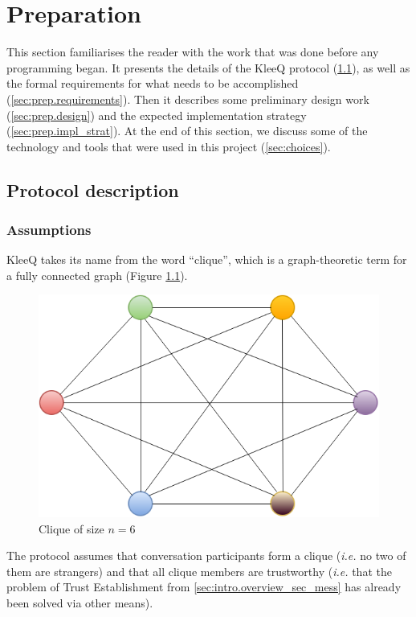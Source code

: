 \documentclass[a4paper, twoside, 12pt]{report}
\newcommand{\skippage}{\newpage\null\newpage}
\begin{document}
\skippage

\chapter{Preparation}
\label{ch:prep}
This section familiarises the reader with the work that was done before any programming began. It presents the details of the KleeQ protocol (\cref{sec:prep.proto}), as well as the formal requirements for what needs to be accomplished (\cref{sec:prep.requirements}). Then it describes some preliminary design work (\cref{sec:prep.design}) and the expected implementation strategy (\cref{sec:prep.impl_strat}). At the end of this section, we discuss some of the technology and tools that were used in this project (\cref{sec:choices}).

\section{Protocol description}
\label{sec:prep.proto}

\subsection{Assumptions}
KleeQ takes its name from the word ``clique'', which is a graph-theoretic term for a fully connected graph (Figure \ref{fig:clique}).
\begin{figure}[h]
    \centering
    \includegraphics[scale = 0.5]{pics/clique.png}
    \caption{Clique of size $n = 6$ \label{fig:clique}}
\end{figure}
The protocol assumes that conversation participants form a clique (\textit{i.e.} no two of them are strangers) and that all clique members are trustworthy (\textit{i.e.} that the problem of Trust Establishment from \cref{sec:intro.overview_sec_mess} has already been solved via other means). 
\end{document}
